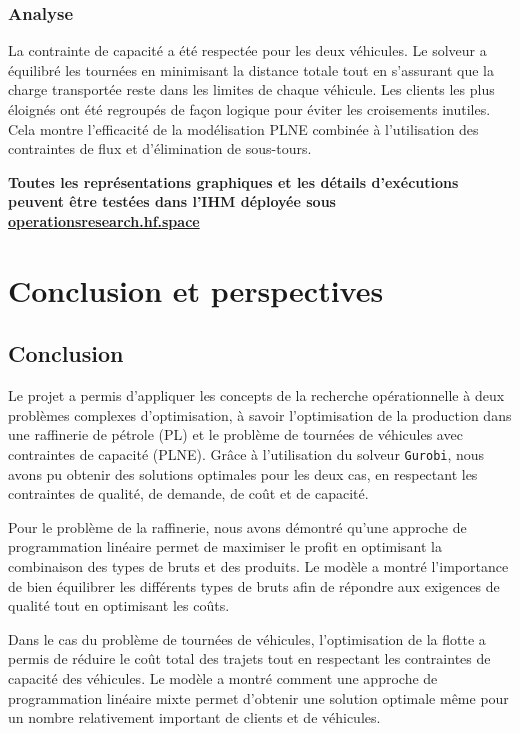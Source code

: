 \documentclass[a4paper,11pt]{article}
\begin{document}
\subsubsection*{Analyse}

La contrainte de capacité a été respectée pour les deux véhicules. Le solveur a équilibré les tournées en minimisant la distance totale tout en s'assurant que la charge transportée reste dans les limites de chaque véhicule. Les clients les plus éloignés ont été regroupés de façon logique pour éviter les croisements inutiles. Cela montre l'efficacité de la modélisation PLNE combinée à l'utilisation des contraintes de flux et d’élimination de sous-tours.





\textbf{Toutes les représentations graphiques et les détails d'exécutions peuvent être testées dans l'IHM déployée sous \href{https://kacemath-operationsresearch.hf.space/}{operationsresearch.hf.space}}
\section{Conclusion et perspectives}

\subsection{Conclusion}

Le projet a permis d’appliquer les concepts de la recherche opérationnelle à deux problèmes complexes d'optimisation, à savoir l'optimisation de la production dans une raffinerie de pétrole (PL) et le problème de tournées de véhicules avec contraintes de capacité (PLNE). Grâce à l’utilisation du solveur \texttt{Gurobi}, nous avons pu obtenir des solutions optimales pour les deux cas, en respectant les contraintes de qualité, de demande, de coût et de capacité.

Pour le problème de la raffinerie, nous avons démontré qu'une approche de programmation linéaire permet de maximiser le profit en optimisant la combinaison des types de bruts et des produits. Le modèle a montré l’importance de bien équilibrer les différents types de bruts afin de répondre aux exigences de qualité tout en optimisant les coûts.

Dans le cas du problème de tournées de véhicules, l’optimisation de la flotte a permis de réduire le coût total des trajets tout en respectant les contraintes de capacité des véhicules. Le modèle a montré comment une approche de programmation linéaire mixte permet d’obtenir une solution optimale même pour un nombre relativement important de clients et de véhicules.
\end{document}
